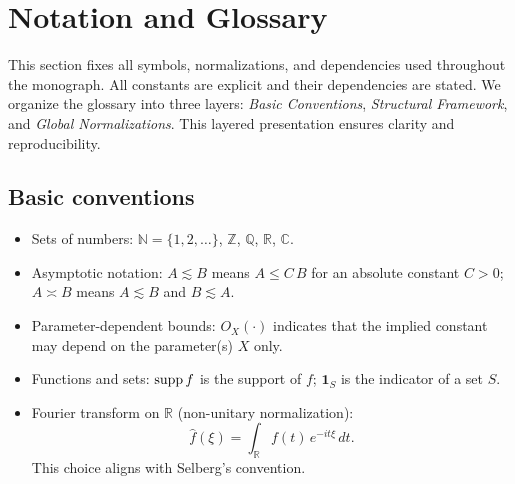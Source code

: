 \section*{Notation and Glossary}

This section fixes all symbols, normalizations, and dependencies used throughout the monograph. 
All constants are explicit and their dependencies are stated. 
We organize the glossary into three layers: 
\emph{Basic Conventions}, \emph{Structural Framework}, and \emph{Global Normalizations}. 
This layered presentation ensures clarity and reproducibility.

\subsection*{Basic conventions}
\begin{itemize}
  \item Sets of numbers: $\mathbb{N}=\{1,2,\dots\}$, $\mathbb{Z}$, $\mathbb{Q}$, $\mathbb{R}$, $\mathbb{C}$.
  \item Asymptotic notation: 
    $A\lesssim B$ means $A\le C\,B$ for an absolute constant $C>0$; 
    $A\asymp B$ means $A\lesssim B$ and $B\lesssim A$.
  \item Parameter-dependent bounds: 
    $O_X(\cdot)$ indicates that the implied constant may depend on the parameter(s) $X$ only.
  \item Functions and sets: 
    $\operatorname{supp} f$ is the support of $f$; 
    $\mathbf{1}_S$ is the indicator of a set $S$.
  \item Fourier transform on $\mathbb{R}$ (non-unitary normalization): 
    \[
      \widehat{f}(\xi)=\int_{\mathbb{R}} f(t)\,e^{-i t \xi}\,dt.
    \]
    This choice aligns with Selberg’s convention.
\end{itemize}

